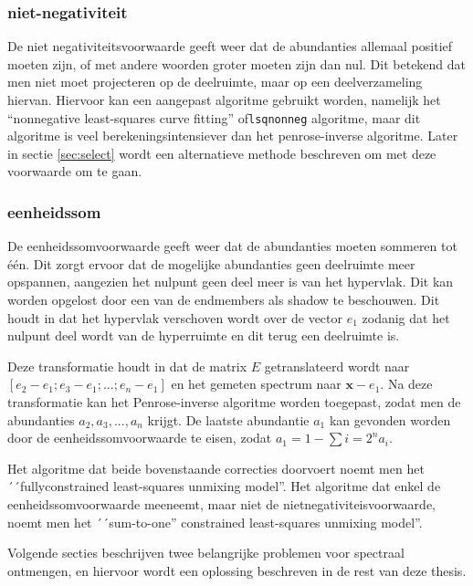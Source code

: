 \documentclass[12pt]{report}
\begin{document}
\subsubsection{niet-negativiteit}

De niet negativiteitsvoorwaarde geeft weer dat de abundanties allemaal positief moeten zijn, of met andere woorden groter moeten zijn dan nul. Dit betekend dat men niet moet projecteren op de deelruimte, maar op een deelverzameling hiervan. Hiervoor kan een aangepast algoritme gebruikt worden, namelijk het ``nonnegative least-squares curve fitting'' of\texttt{lsqnonneg} algoritme, maar dit algoritme is veel berekeningsintensiever dan het penrose-inverse algoritme. Later in sectie \ref{sec:select} wordt een alternatieve methode beschreven om met deze voorwaarde om te gaan.

\subsubsection{eenheidssom}

De eenheidssomvoorwaarde geeft weer dat de abundanties moeten sommeren tot \'e\'en. Dit zorgt ervoor dat de mogelijke abundanties geen deelruimte meer opspannen, aangezien het nulpunt geen deel meer is van het hypervlak. Dit kan worden opgelost door een van de endmembers als shadow te beschouwen. Dit houdt in dat het hypervlak verschoven wordt over de vector $e_1$ zodanig dat het nulpunt deel wordt van de hyperruimte en dit terug een deelruimte is.

Deze transformatie houdt in dat de matrix $E$ getranslateerd wordt naar $[e_2-e_1;e_3-e_1;...;e_n-e_1]$ en het gemeten spectrum naar $\bm{x} - e_1$. Na deze transformatie kan het Penrose-inverse algoritme worden toegepast, zodat men de abundanties $a_2,a_3,...,a_n$ krijgt. De laatste abundantie $a_1$ kan gevonden worden door de eenheidssomvoorwaarde te eisen, zodat $a_1 = 1 - \sum{i=2}^{n} a_i$.

\vspace{5 mm}
Het algoritme dat beide bovenstaande correcties doorvoert noemt men het ´´fullyconstrained
least-squares unmixing model''. Het algoritme dat enkel de eenheidssomvoorwaarde meeneemt, maar niet de nietnegativiteisvoorwaarde, noemt men het ´´sum-to-one''
constrained least-squares unmixing model''.


 
\vspace{5 mm}

Volgende secties beschrijven twee belangrijke problemen voor spectraal ontmengen, en hiervoor wordt een oplossing beschreven in de rest van deze thesis.
\end{document}
